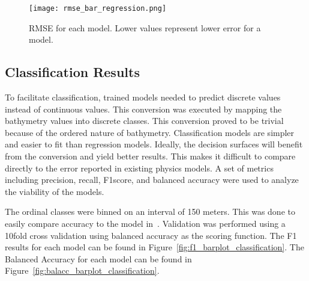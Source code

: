 \begin{figure}[htp]
    \centering
    \texttt{[image: rmse\_bar\_regression.png]} 
    \caption{RMSE for each model. Lower values represent lower error for a model.}
    \label{fig:rmse_barplot_regression}
\end{figure}


\subsection{Classification Results}
\setlength{\parindent}{10ex}
To facilitate classification, trained models needed to predict discrete values instead of continuous values.
This conversion was executed by mapping the bathymetry values into discrete classes.
This conversion proved to be trivial because of the ordered nature of bathymetry.
Classification models are simpler and easier to fit than regression models.
Ideally, the decision surfaces will benefit from the conversion and yield better results.
This makes it difficult to compare directly to the error reported in existing physics models.
A set of metrics including precision, recall, F1\-score, and balanced accuracy were used to analyze the viability of the models.

\par
The ordinal classes were binned on an interval of 150 meters.
This was done to easily compare accuracy to the model in~\cite{jena2012prediction}.
Validation was performed using a 10\-fold cross validation using balanced accuracy as the scoring function.
The F1 results for each model can be found in Figure~\ref{fig:f1_barplot_classification}.
The Balanced Accuracy for each model can be found in Figure~\ref{fig:balacc_barplot_classification}.


